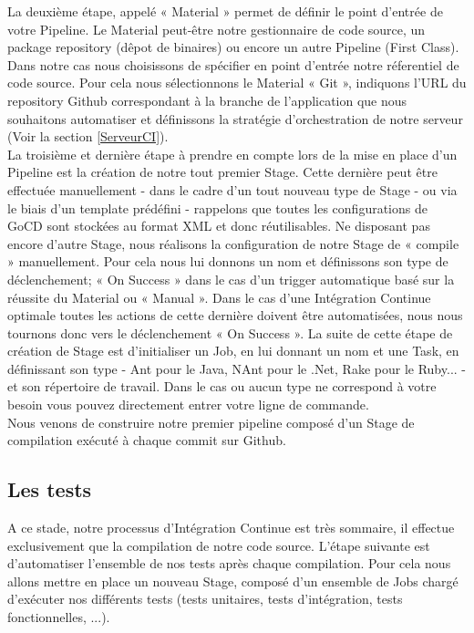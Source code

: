       La deuxième étape, appelé « Material » permet de définir le point d'entrée de votre Pipeline. Le Material peut-être notre gestionnaire de code source, un package repository (dêpot de binaires) ou encore un autre Pipeline (First Class). Dans notre cas nous choisissons de spécifier en point d'entrée notre réferentiel de code source. Pour cela nous sélectionnons le Material « Git », indiquons l'URL du repository Github correspondant à la branche de l'application que nous souhaitons automatiser et définissons la stratégie d'orchestration de notre serveur (Voir la section \ref{ServeurCI}).\\

      La troisième et dernière étape à prendre en compte lors de la mise en place d'un Pipeline est la création de notre tout premier Stage. Cette dernière peut être effectuée manuellement - dans le cadre d'un tout nouveau type de Stage - ou via le biais d'un template prédéfini - rappelons que toutes les configurations de GoCD sont stockées au format XML et donc réutilisables. Ne disposant pas encore d'autre Stage, nous réalisons la configuration de notre Stage de « compile » manuellement. Pour cela nous lui donnons un nom et définissons son type de déclenchement; « On Success » dans le cas d'un trigger automatique basé sur la réussite du Material ou « Manual ». Dans le cas d'une Intégration Continue optimale toutes les actions de cette dernière doivent être automatisées, nous nous tournons donc vers le déclenchement « On Success ». La suite de cette étape de création de Stage est d'initialiser un Job, en lui donnant un nom et une Task, en définissant son type - Ant pour le Java, NAnt pour le .Net, Rake pour le Ruby... - et son répertoire de travail. Dans le cas ou aucun type ne correspond à votre besoin vous pouvez directement entrer votre ligne de commande.\\

      Nous venons de construire notre premier pipeline composé d'un Stage de compilation exécuté à chaque commit sur Github.

      \subsection{Les tests}
      A ce stade, notre processus d'Intégration Continue est très sommaire, il effectue exclusivement que la compilation de notre code source. L'étape suivante est d'automatiser l'ensemble de nos tests après chaque compilation. Pour cela nous allons mettre en place un nouveau Stage, composé d'un ensemble de Jobs chargé d'exécuter nos différents tests (tests unitaires, tests d'intégration, tests fonctionnelles, ...).\\

